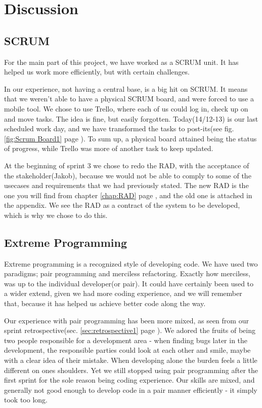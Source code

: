 \chapter{Discussion}
\label{chap:Discusion}

\section{SCRUM}
For the main part of this project, we have worked as a SCRUM unit. It has helped us work more efficiently, but with certain challenges.

In our experience, not having a central base, is a big hit on SCRUM. It means that we weren't able to have a physical SCRUM board, and were forced to use a mobile tool. We chose to use Trello, where each of us could log in, check up on and move tasks. The idea is fine, but easily forgotten. Today(14/12-13) is our last scheduled work day, and we have transformed the tasks to post-its(see fig. \ref{fig:Scrum Board1} page \pageref{fig:Scrum Board1}). To sum up, a physical board attained being the status of progress, while Trello was more of another task to keep updated.

At the beginning of sprint 3 we chose to redo the RAD, with the acceptance of the stakeholder(Jakob), because we would not be able to comply to some of the usecases and requirements that we had previously stated. The new RAD is the one you will find from chapter \ref{chap:RAD} page \pageref{chap:RAD}, and the old one is attached in the appendix. We see the RAD as a contract of the system to be developed, which is why we chose to do this.

\section{Extreme Programming}
Extreme programming is a recognized style of developing code. We have used two paradigms; pair programming and merciless refactoring. Exactly how merciless, was up to the individual developer(or pair). It could have certainly been used to a wider extend, given we had more coding experience, and we will remember that, because it has helped us achieve better code along the way.

Our experience with pair programming has been more mixed, as seen from our sprint retrospective(sec. \ref{sec:retrospective1} page \pageref{sec:retrospective1}). We adored the fruits of being two people responsible for a development area - when finding bugs later in the development, the responsible parties could look at each other and smile, maybe with a clear idea of their mistake. When developing alone the burden feels a little different on ones shoulders. Yet we still stopped using pair programming after the first sprint for the sole reason being coding experience. Our skills are mixed, and generally not good enough to develop code in a pair manner efficiently - it simply took too long. 

